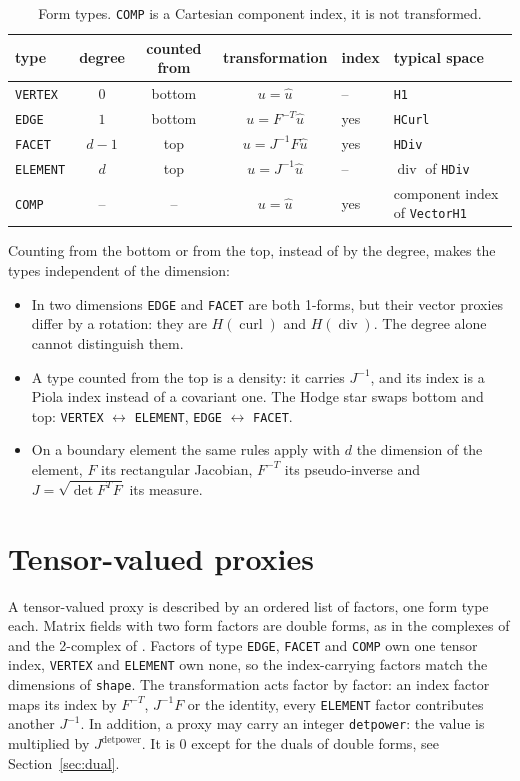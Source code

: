 \documentclass[10pt,a4paper]{article}
\newcommand{\code}[1]{\texttt{#1}}
\begin{document}
\begin{table}[h]\centering\small
\begin{tabular}{@{}lcccll@{}}\toprule
type & degree & counted from & transformation & index & typical space \\\midrule
\code{VERTEX}  & $0$   & bottom & $u = \hat u$ & -- & \code{H1} \\
\code{EDGE}    & $1$   & bottom & $u = F^{-T} \hat u$ & yes & \code{HCurl} \\
\code{FACET}   & $d-1$ & top    & $u = J^{-1} F \hat u$ & yes & \code{HDiv} \\
\code{ELEMENT} & $d$   & top    & $u = J^{-1} \hat u$ & -- & $\operatorname{div}$ of \code{HDiv} \\\midrule
\code{COMP}    & --    & --     & $u = \hat u$ & yes & component index of \code{VectorH1} \\\bottomrule
\end{tabular}
\caption{Form types. \code{COMP} is a Cartesian component index, it is not transformed.}\label{tab:types}
\end{table}

Counting from the bottom or from the top, instead of by the degree, makes the types independent of the dimension:
\begin{itemize}\setlength\itemsep{1pt}
\item In two dimensions \code{EDGE} and \code{FACET} are both 1-forms, but their vector proxies differ by a rotation: they are $H(\operatorname{curl})$ and $H(\operatorname{div})$. The degree alone cannot distinguish them.
\item A type counted from the top is a density: it carries $J^{-1}$, and its index is a Piola index instead of a covariant one. The Hodge star swaps bottom and top: \code{VERTEX} $\leftrightarrow$ \code{ELEMENT}, \code{EDGE} $\leftrightarrow$ \code{FACET}.
\item On a boundary element the same rules apply with $d$ the dimension of the element, $F$ its rectangular Jacobian, $F^{-T}$ its pseudo-inverse and $J = \sqrt{\det F^TF}$ its measure.
\end{itemize}

\section{Tensor-valued proxies}

A tensor-valued proxy is described by an ordered list of factors, one form type each. Matrix fields with two form factors are double forms, as in the complexes of \cite{ah21} and the 2-complex of \cite{ghs25}. Factors of type \code{EDGE}, \code{FACET} and \code{COMP} own one tensor index, \code{VERTEX} and \code{ELEMENT} own none, so the index-carrying factors match the dimensions of \code{shape}. The transformation acts factor by factor: an index factor maps its index by $F^{-T}$, $J^{-1}F$ or the identity, every \code{ELEMENT} factor contributes another $J^{-1}$. In addition, a proxy may carry an integer \code{detpower}: the value is multiplied by $J^{\mathrm{detpower}}$. It is $0$ except for the duals of double forms, see Section~\ref{sec:dual}.
\end{document}
